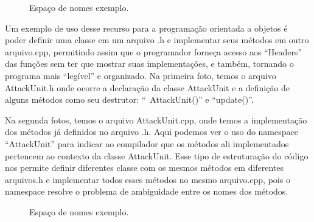 \documentclass[rel_mlp]{iiufrgs}
\newcommand{\fonte}[1]{\\Fonte: {#1}}
\begin{document}
   \begin{figure}[htb]
       \centering
       \label{fig:figura4}
       \caption{Espaço de nomes exemplo.}
   \end{figure}

   Um exemplo de uso desse recurso para a programação orientada a objetos é poder definir uma classe em um arquivo .h e implementar seus métodos em outro arquivo.cpp, permitindo assim que o programador forneça acesso aos “Headers” das funções sem ter que mostrar suas implementações, e também, tornando o programa mais “legível” e organizado.
   	Na primeira foto, temos o arquivo AttackUnit.h onde ocorre a declaração da classe AttackUnit e a definição de alguns métodos como seu destrutor: “~AttackUnit()” e “update()”.

   	Na segunda fotos, temos o arquivo AttackUnit.cpp, onde temos a implementação dos métodos já definidos no arquivo .h. Aqui podemos ver o uso do namespace “AttackUnit” para indicar ao compilador que os métodos ali implementados pertencem ao contexto da classe AttackUnit.
   	Esse tipo de estruturação do código nos permite definir diferentes classe com os mesmos métodos em diferentes arquivos.h  e implementar todos esses métodos no mesmo arquivo.cpp, pois o namespace resolve o problema de ambiguidade entre os nomes dos métodos.


   \begin{figure}[htb]
       \centering
       \label{fig:figura5}
       \caption{Espaço de nomes exemplo.}
   \end{figure}
\end{document}
